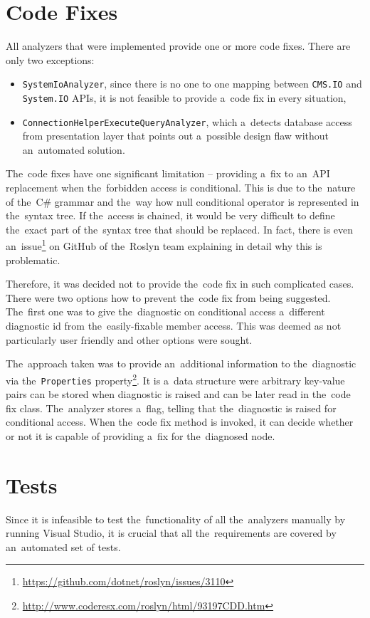 \documentclass[
  digital, %
  table,   %
  lof,     %
  lot,     %
  oneside,
]{fithesis3}
\begin{document}
\section{Code Fixes}
\label{sec:code-fixes}
All analyzers that were implemented provide one or more code fixes. There are only two exceptions:
\begin{itemize}
  \item \texttt{SystemIoAnalyzer}, since there is no one to one mapping between \texttt{CMS.IO} and \texttt{System.IO} APIs, it is not feasible to provide a~code fix in every situation,

  \item \texttt{ConnectionHelperExecuteQueryAnalyzer}, which a~detects database access from presentation layer that points out a~possible design flaw without an~automated solution.
\end{itemize} 

The~code fixes have one significant limitation -- providing a~fix to an~API replacement when the~forbidden access is conditional. This is due to the~nature of the~C\# grammar and the~way how null conditional operator is represented in the~syntax tree. If the~access is chained, it would be very difficult to define the~exact part of the~syntax tree that should be replaced. In fact, there is even an~issue\footnote{\url{https://github.com/dotnet/roslyn/issues/3110}} on GitHub of the~Roslyn team explaining in detail why this is problematic. 

Therefore, it was decided not to provide the~code fix in such complicated cases. There were two options how to prevent the~code fix from being suggested. The~first one was to give the~diagnostic on conditional access a~different diagnostic id from the~easily-fixable member access. This was deemed as not particularly user friendly and other options were sought.

The~approach taken was to provide an~additional information to the~diagnostic via the~\texttt{Properties} property\footnote{\url{http://www.coderesx.com/roslyn/html/93197CDD.htm}}. It is a~data structure were arbitrary key-value pairs can be stored when diagnostic is raised and can be later read in the~code fix class. The~analyzer stores a~flag, telling that the~diagnostic is raised for conditional access. When the~code fix method is invoked, it can decide whether or not it is capable of providing a~fix for the~diagnosed node.

\section{Tests}
Since it is infeasible to test the~functionality of all the~analyzers manually by running Visual Studio, it is crucial that all the~requirements are covered by an~automated set of tests. 
\end{document}
